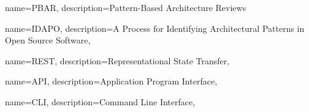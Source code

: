

 {
name={PBAR},
description={Pattern-Based Architecture Reviews}
}

 {
name={IDAPO},
description={A Process for Identifying Architectural Patterns in Open Source Software},
}

 {
name={REST},
description={Representational State Transfer},
}

 {
name={API},
description={Application Program Interface},
}

 {
name={CLI},
description={Command Line Interface},
}